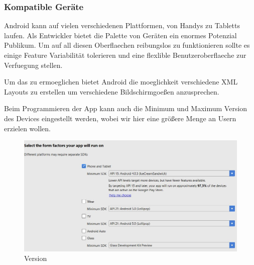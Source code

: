 \subsubsection{Kompatible Geräte}
\label{subsec:device-compability}

Android kann auf vielen verschiedenen Plattformen, von Handys zu Tabletts laufen.
Als Entwickler bietet die Palette von Geräten ein enormes Potenzial Publikum.
Um auf all diesen Oberflaechen reibungslos zu funktionieren sollte es einige Feature Variabilität tolerieren und eine flexlible Benutzeroberflaeche zur Verfuegung stellen. 

Um das zu ermoeglichen bietet Android die moeglichkeit verschiedene XML Layouts zu erstellen um verschiedene Bildschirmgoeßen anzusprechen.

Beim Programmieren der App kann auch die Minimum und Maximum Version des Devices eingestellt werden, wobei wir hier eine größere Menge an Usern erzielen wollen. 

\begin{figure}[!htb]\centering
	\includegraphics[width=1.0 \textwidth]{images/MinMaxVers}
	\caption{Version}\label{Fig:Version}
\end{figure}



\clearpage %